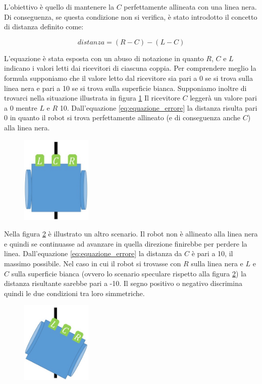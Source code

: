 \documentclass[twoside,twocolumn]{article}
\begin{document}
L'obiettivo è quello di mantenere la $C$ perfettamente allineata con una linea nera. Di conseguenza, se questa condizione non si verifica, è stato introdotto il concetto di distanza definito come:

\begin{equation} \label{eq:equazione_errore}
distanza = (R - C) - (L - C)
\end{equation}

L'equazione è stata esposta con un abuso di notazione in quanto $R$, $C$ e $L$ indicano i valori letti dai ricevitori di ciascuna coppia. Per comprendere meglio la formula supponiamo che il valore letto dal ricevitore sia pari a 0 se si trova sulla linea nera e pari a 10 se si trova sulla superficie bianca. Supponiamo inoltre di trovarci nella situazione illustrata in figura \ref{fig:t0}
Il ricevitore $C$ leggerà un valore pari a 0 mentre $L$ e $R$ 10. Dall'equazione \ref{eq:equazione_errore} la distanza risulta pari 0 in quanto il robot si trova perfettamente allineato (e di conseguenza anche $C$) alla linea nera.

\begin{figure}[h]
	\centering
	\includegraphics[width=0.3\textwidth]{immagini/t0}
	\caption{}
	\label{fig:t0}
\end{figure}

Nella figura \ref{fig:t1} è illustrato un altro scenario. Il robot non è allineato alla linea nera e quindi se continuasse ad avanzare in quella direzione finirebbe per perdere la linea. Dall'equazione \ref{eq:equazione_errore} la distanza da $C$ è pari a 10, il massimo possibile. Nel caso in cui il robot si trovasse con $R$ sulla linea nera e $L$ e $C$ sulla superficie bianca (ovvero lo scenario speculare rispetto alla figura \ref{fig:t1}) la distanza risultante sarebbe pari a -10. Il segno positivo o negativo discrimina quindi le due condizioni tra loro simmetriche.

\begin{figure}[h]
	\centering
	\includegraphics[width=0.3\textwidth]{immagini/t1}
	\caption{}
	\label{fig:t1}
\end{figure}
\end{document}
